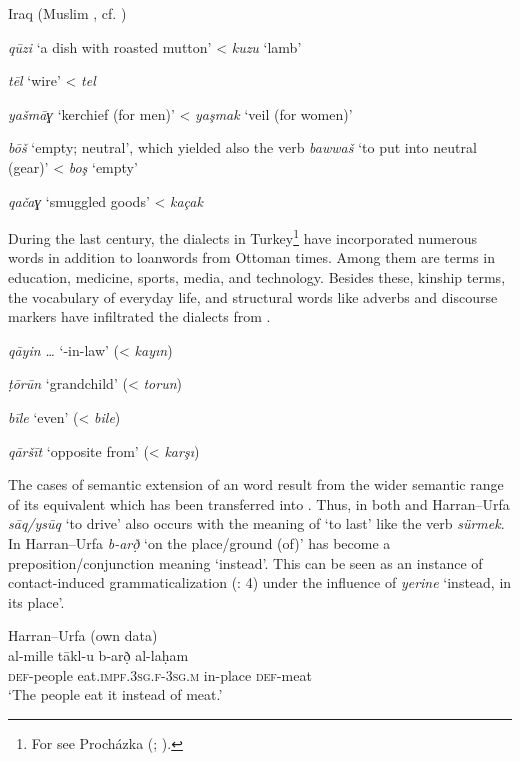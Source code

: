 \documentclass[output=paper]{langsci/langscibook}
\begin{document}
\ea
Iraq (Muslim , cf. \citealt{Reinkowski1995}) 

\textit{qūzi} ‘a dish with roasted mutton’ <  \textit{kuzu} ‘lamb’

\textit{tēl} ‘wire’ <  \textit{tel}

\textit{yašmāɣ} ‘kerchief (for men)’ <  \textit{yaşmak} ‘veil (for women)’

\textit{bōš} ‘empty; neutral’, which yielded also the verb \textit{bawwaš} ‘to put into neutral (gear)’ <  \textit{boş} ‘empty’

\textit{qačaɣ} ‘smuggled goods’ <  \textit{kaçak}
\z

During the last century, the  dialects in Turkey\footnote{For  see Procházka (\citeyear{Procházka2002Cukurova}; \citeyear[187--199]{Procházka2002Adana}).} have incorporated numerous  words in addition to {loanwords} from Ottoman times. Among them are terms in education, medicine, sports, media, and technology. Besides these, kinship terms, the vocabulary of everyday life, and structural words like adverbs and discourse markers have infiltrated the dialects from . 

\ea
{} 

\textit{qāyin} \textit{…} ‘-in-law’ (<  \textit{kayın})

\textit{ṭōrūn} ‘grandchild’ (<  \textit{torun})

\textit{bīle} ‘even’ (<  \textit{bile})

\textit{qāršīt} ‘opposite from’ (<  \textit{karşı})
\z

The cases of semantic {extension} of an  word result from the wider semantic range of its  equivalent which has been transferred into . Thus, in both  and Harran--Urfa  \textit{sāq/ysūq} ‘to drive’ also occurs with the meaning of ‘to last’ like the  verb \textit{sürmek}. In Harran--Urfa \textit{b-arð̣} ‘on the place/ground (of)’ has become a {preposition}/conjunction meaning ‘instead’. This can be seen as an instance of {contact-induced grammaticalization} (\citealt{GardaniArkadievAmiridze2015}: 4) under the influence of  \textit{yerine} ‘instead, in its place’.

\ea
{Harran--Urfa (own data)}\\
 \gll   al-mille tākl-u b-arð̣ al-laḥam\\
     \textsc{def}{}-people eat.\textsc{impf.3sg.f-3sg.m}  in-place \textsc{def}{}-meat\\
\glt  ‘The people eat it instead of meat.’
\z
\end{document}
